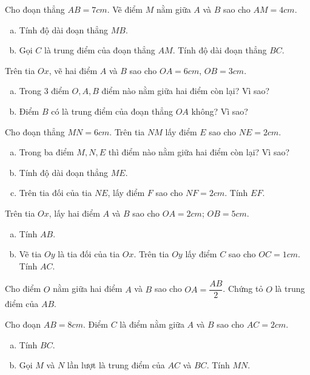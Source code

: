 \begin{bt}
\end{bt}   \begin{bt}
Cho đoạn thẳng $AB = 7 cm.$ Vẽ điểm $M$ nằm giữa $A$ và $B$ sao cho $AM = 4cm.$
\begin{enumerate}[a)]
\item Tính độ dài đoạn thẳng $MB.$
\item Gọi $C$ là trung điểm của đoạn thẳng $AM.$ Tính độ dài đoạn thẳng $BC.$
\end{enumerate}

\end{bt}   \begin{bt}
Trên tia $Ox$, vẽ hai điểm $A$ và $B$ sao cho $OA = 6cm$, $OB = 3 cm.$
\begin{enumerate}[a)]
\item Trong 3 điểm  $O, A, B$ điểm nào nằm giữa hai điểm còn lại? Vì sao?
\item Điểm $B$ có là trung điểm của đoạn thẳng $OA$ không? Vì sao?
\end{enumerate}

\end{bt}   \begin{bt}
Cho đoạn thẳng $MN = 6cm$. Trên tia $NM$ lấy điểm $E$ sao cho $NE = 2cm.$
\begin{enumerate}[a)]
\item Trong ba điểm $M, N, E$ thì điểm nào nằm giữa hai điểm còn lại? Vì sao?
\item Tính độ dài đoạn thẳng $ME$.
\item Trên tia đối của tia $NE$, lấy điểm $F$ sao cho $NF = 2 cm.$ Tính $EF$.
\end{enumerate}

\end{bt}   \begin{bt}
Trên tia $Ox$, lấy hai điểm $A$ và $B$ sao cho $OA = 2 cm$; $OB = 5 cm.$
\begin{enumerate}[a)]
\item Tính $AB$.
\item Vẽ tia $Oy$ là tia đối của tia $Ox$. Trên tia $Oy$ lấy điểm $C$ sao cho $OC = 1 cm.$ Tính $AC$.
\end{enumerate}

\end{bt}   \begin{bt}
Cho điểm $O$ nằm giữa hai điểm $A$ và $B$ sao cho $OA = \dfrac{AB}{2}$. Chứng tỏ $O$ là trung điểm của $AB$.

\end{bt}   \begin{bt}
Cho đoạn $AB = 8 cm.$ Điểm $C$ là điểm nằm giữa $A$ và $B$ sao cho $AC = 2 cm.$
\begin{enumerate}[a)]
\item Tính $BC$.
\item Gọi $M$ và $N$ lần lượt là trung điểm của $AC$ và $BC.$ Tính $MN$.
\end{enumerate}


\end{bt}
